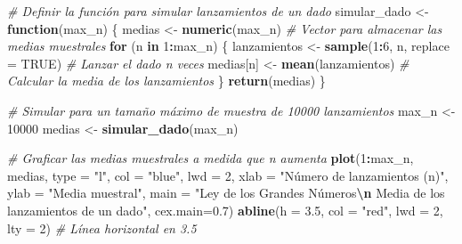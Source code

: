\documentclass[
]{article}
\newenvironment{Shaded}{\begin{snugshade}}{\end{snugshade}}
\newcommand{\AttributeTok}[1]{\textcolor[rgb]{0.13,0.29,0.53}{#1}}
\newcommand{\CommentTok}[1]{\textcolor[rgb]{0.56,0.35,0.01}{\textit{#1}}}
\newcommand{\ConstantTok}[1]{\textcolor[rgb]{0.56,0.35,0.01}{#1}}
\newcommand{\ControlFlowTok}[1]{\textcolor[rgb]{0.13,0.29,0.53}{\textbf{#1}}}
\newcommand{\DecValTok}[1]{\textcolor[rgb]{0.00,0.00,0.81}{#1}}
\newcommand{\FloatTok}[1]{\textcolor[rgb]{0.00,0.00,0.81}{#1}}
\newcommand{\FunctionTok}[1]{\textcolor[rgb]{0.13,0.29,0.53}{\textbf{#1}}}
\newcommand{\NormalTok}[1]{#1}
\newcommand{\OtherTok}[1]{\textcolor[rgb]{0.56,0.35,0.01}{#1}}
\newcommand{\SpecialCharTok}[1]{\textcolor[rgb]{0.81,0.36,0.00}{\textbf{#1}}}
\newcommand{\StringTok}[1]{\textcolor[rgb]{0.31,0.60,0.02}{#1}}
\begin{document}
\begin{Shaded}
\begin{Highlighting}[]
\CommentTok{\# Definir la función para simular lanzamientos de un dado}
\NormalTok{simular\_dado }\OtherTok{\textless{}{-}} \ControlFlowTok{function}\NormalTok{(max\_n) \{}
\NormalTok{  medias }\OtherTok{\textless{}{-}} \FunctionTok{numeric}\NormalTok{(max\_n)  }\CommentTok{\# Vector para almacenar las medias muestrales}
  \ControlFlowTok{for}\NormalTok{ (n }\ControlFlowTok{in} \DecValTok{1}\SpecialCharTok{:}\NormalTok{max\_n) \{}
\NormalTok{    lanzamientos }\OtherTok{\textless{}{-}} \FunctionTok{sample}\NormalTok{(}\DecValTok{1}\SpecialCharTok{:}\DecValTok{6}\NormalTok{, n, }\AttributeTok{replace =} \ConstantTok{TRUE}\NormalTok{)  }\CommentTok{\# Lanzar el dado n veces}
\NormalTok{    medias[n] }\OtherTok{\textless{}{-}} \FunctionTok{mean}\NormalTok{(lanzamientos)  }\CommentTok{\# Calcular la media de los lanzamientos}
\NormalTok{  \}}
  \FunctionTok{return}\NormalTok{(medias)}
\NormalTok{\}}

\CommentTok{\# Simular para un tamaño máximo de muestra de 10000 lanzamientos}
\NormalTok{max\_n }\OtherTok{\textless{}{-}} \DecValTok{10000}
\NormalTok{medias }\OtherTok{\textless{}{-}} \FunctionTok{simular\_dado}\NormalTok{(max\_n)}

\CommentTok{\# Graficar las medias muestrales a medida que n aumenta}
\FunctionTok{plot}\NormalTok{(}\DecValTok{1}\SpecialCharTok{:}\NormalTok{max\_n, medias, }\AttributeTok{type =} \StringTok{"l"}\NormalTok{, }\AttributeTok{col =} \StringTok{"blue"}\NormalTok{, }\AttributeTok{lwd =} \DecValTok{2}\NormalTok{,}
     \AttributeTok{xlab =} \StringTok{"Número de lanzamientos (n)"}\NormalTok{, }\AttributeTok{ylab =} \StringTok{"Media muestral"}\NormalTok{,}
     \AttributeTok{main =} \StringTok{"Ley de los Grandes Números}\SpecialCharTok{\textbackslash{}n}\StringTok{ Media de los lanzamientos de un dado"}\NormalTok{, }\AttributeTok{cex.main=}\FloatTok{0.7}\NormalTok{)}
\FunctionTok{abline}\NormalTok{(}\AttributeTok{h =} \FloatTok{3.5}\NormalTok{, }\AttributeTok{col =} \StringTok{"red"}\NormalTok{, }\AttributeTok{lwd =} \DecValTok{2}\NormalTok{, }\AttributeTok{lty =} \DecValTok{2}\NormalTok{)  }\CommentTok{\# Línea horizontal en 3.5}
\end{Highlighting}
\end{Shaded}
\end{document}
